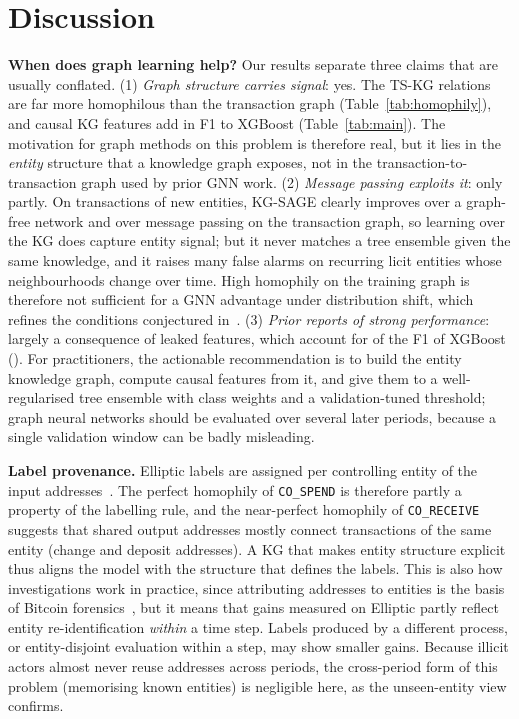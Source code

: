 \section{Discussion}\label{sec:discussion}

\textbf{When does graph learning help?} Our results separate three claims
that are usually conflated. (1) \emph{Graph structure carries signal}: yes.
The TS-KG relations are far more homophilous than the transaction graph
(Table~\ref{tab:homophily}), and causal KG features add
\XgbKgGain{} in F1 to XGBoost
(Table~\ref{tab:main}). The motivation for graph methods on this problem is
therefore real, but it lies in the \emph{entity} structure that a knowledge
graph exposes, not in the transaction-to-transaction graph used by prior GNN
work. (2) \emph{Message passing exploits it}: only partly. On transactions of new
entities, KG-SAGE clearly improves over a graph-free network and over message
passing on the transaction graph, so learning over the KG does capture entity
signal; but it never matches a tree ensemble given the same knowledge, and it
raises many false alarms on recurring licit entities whose neighbourhoods
change over time. High homophily on the training graph is therefore not
sufficient for a GNN advantage under distribution shift, which refines the
conditions conjectured in~\cite{maganti2026}. (3) \emph{Prior reports of
strong performance}: largely a consequence of leaked features, which account for
\XgbLeakDrop{} of the \XgbAllFone{} F1 of XGBoost (\XgbLeakShare{}). For
practitioners, the actionable recommendation is to build the entity knowledge
graph, compute causal features from it, and give them to a well-regularised
tree ensemble with class weights and a validation-tuned threshold; graph
neural networks should be evaluated over several later periods, because a
single validation window can be badly misleading.

\textbf{Label provenance.} Elliptic labels are assigned per controlling
entity of the input addresses~\cite{weber2019,safar2026}. The perfect
homophily of \texttt{CO\_SPEND} is therefore partly a property of the
labelling rule, and the near-perfect homophily of \texttt{CO\_RECEIVE}
suggests that shared output addresses mostly connect transactions of the same
entity (change and deposit addresses). A KG that makes entity structure
explicit thus aligns the model with the structure that defines the labels.
This is also how investigations work in practice, since attributing addresses
to entities is the basis of Bitcoin forensics~\cite{meiklejohn2013}, but it
means that gains measured on Elliptic partly reflect entity re-identification
\emph{within} a time step. Labels produced by a different process, or
entity-disjoint evaluation within a step, may show smaller gains. Because
illicit actors almost never reuse addresses across periods, the
cross-period form of this problem (memorising known entities) is negligible
here, as the unseen-entity view confirms.

